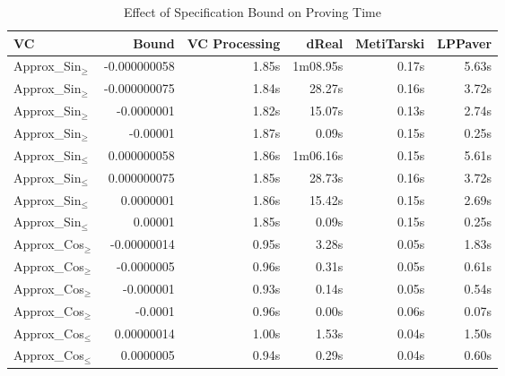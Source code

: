 \documentclass[runningheads]{llncs}
\begin{document}
\begin{table}[tb]
  \caption{Effect of Specification Bound on Proving Time}
  \label{table:benchmarks-spec}
  \centering
  \begin{tabular}{l@{\kern1em}r@{\kern1em}r@{\kern1em}r@{\kern1em}r@{\kern1em}r}
  \toprule %
  VC                                   & Bound        & VC Processing & dReal     & MetiTarski  & LPPaver \\
  \midrule
  Approx\_Sin${}_\ge$                 & -0.000000058  & 1.85s         & 1m08.95s  & 0.17s       & 5.63s \\
  Approx\_Sin${}_\ge$                 & -0.000000075  & 1.84s         & 28.27s    & 0.16s       & 3.72s \\
  Approx\_Sin${}_\ge$                 & -0.0000001    & 1.82s         & 15.07s    & 0.13s       & 2.74s \\
  Approx\_Sin${}_\ge$                 & -0.00001      & 1.87s         & 0.09s     & 0.15s       & 0.25s \\[1ex]
  Approx\_Sin${}_\le$                 & 0.000000058   & 1.86s         & 1m06.16s  & 0.15s       & 5.61s \\
  Approx\_Sin${}_\le$                 & 0.000000075   & 1.85s         & 28.73s    & 0.16s       & 3.72s \\
  Approx\_Sin${}_\le$                 & 0.0000001     & 1.86s         & 15.42s    & 0.15s       & 2.69s \\
  Approx\_Sin${}_\le$                 & 0.00001       & 1.85s         & 0.09s     & 0.15s       & 0.25s \\[1ex]
  Approx\_Cos${}_\ge$                 & -0.00000014   & 0.95s         & 3.28s     & 0.05s       & 1.83s \\
  Approx\_Cos${}_\ge$                 & -0.0000005    & 0.96s         & 0.31s     & 0.05s       & 0.61s \\
  Approx\_Cos${}_\ge$                 & -0.000001     & 0.93s         & 0.14s     & 0.05s       & 0.54s \\
  Approx\_Cos${}_\ge$                 & -0.0001       & 0.96s         & 0.00s     & 0.06s       & 0.07s \\[1ex]
  Approx\_Cos${}_\le$                 & 0.00000014    & 1.00s         & 1.53s     & 0.04s       & 1.50s \\
  Approx\_Cos${}_\le$                 & 0.0000005     & 0.94s         & 0.29s     & 0.04s       & 0.60s \\

\end{tabular}
\end{table}
\end{document}
